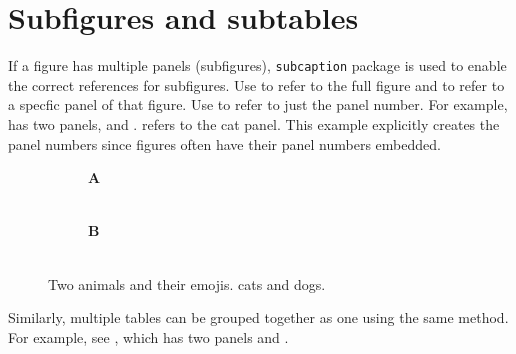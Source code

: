 \section{Subfigures and subtables}
If a figure has multiple panels (subfigures), \texttt{subcaption} package is used to enable the correct references for subfigures.
Use \cmd{\fref} to refer to the full figure and \cmd{\fref} to refer to a specfic panel of that figure.
Use \cmd{\subcaptionref} to refer to just the panel number.
For example,  has two panels,  and .
 refers to the cat panel.
This example explicitly creates the panel numbers since figures often have their panel numbers embedded.

\begin{figure}[t]
    \begin{subfigure}[b]{.5\linewidth}
        \centering
        \textbf{\sffamily A}\\[-0.5\onelineskip]
        \HUGE {}\\
    \end{subfigure}%
    \begin{subfigure}[b]{.5\linewidth}
        \centering
        \textbf{\sffamily B}\\[-0.5\onelineskip]
        \HUGE {}\\
    \end{subfigure}
    \caption[Two animals and their emojis.]{%
        Two animals and their emojis.
         cats and  dogs.
    }
    \label{fig:subfigure-demo}
\end{figure}

Similarly, multiple tables can be grouped together as one using the same method.
For example, see , which has two panels  and .

